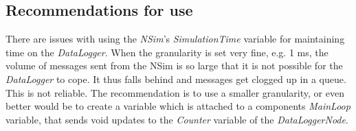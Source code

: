 \documentclass[10pt, notitlepage, a4paper]{article}
\begin{document}
\subsection{Recommendations for use}
There are issues with using the {\it NSim}'s {\it SimulationTime} variable for
maintaining time on the {\it DataLogger}. When the granularity is set very fine,
e.g. 1 ms, the volume of messages sent from the NSim is so large that it is not
possible for the {\it DataLogger} to cope. It thus falls behind and messages get
clogged up in a queue. This is not reliable. The recommendation is to use a
smaller granularity, or even better would be to create a variable which is
attached to a components {\it MainLoop} variable, that sends void updates to the
{\it Counter} variable of the {\it DataLoggerNode}. 
\end{document}
